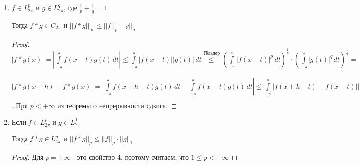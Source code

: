 \begin{properties}
\begin{enumerate}
{            \begin{proof}
                $c_k (f * g) = \frac{1}{2\pi} \int\limits_{-\pi}^\pi e^{ikx} f*g (x) \, dx = \frac{1}{2\pi} \int\limits_{-\pi}^\pi e^{ikx} \int\limits_{-\pi}^\pi f(x - t) g(t) \, dt \, dx = \\ 
                = \frac{1}{2\pi} \int\limits_{-\pi}^\pi \int\limits_{-\pi}^\pi e^{ik(x - t)}e^{ikt} f(x - t) g(t) \, dt \, dx = 
                \frac{1}{2\pi} \int\limits_{-\pi}^\pi e^{ikt} g(t) \int\limits_{-\pi}^\pi e^{ik(x - t)} f(\underbrace{x - t}_{=s}) \, dx \, dt = \\
                = \frac{1}{2\pi} \int\limits_{-\pi}^\pi e^{ikt} g(t) \int\limits_{x-\pi}^{x+\pi} e^{iks} f(s) \, ds \, dt  = c_k (f) \int\limits_{-\pi}^\pi e^{ikt} g(t) \, dt$
            \end{proof}
        }
        \item {
            $f \in L_{2\pi}^p$ и $g \in L_{2\pi}^q$, где $\frac{1}{p} + \frac{1}{q} = 1$

            Тогда $f * g \in C_{2\pi}$ и $||f * g||_{\infty} \leqslant ||f||_p \cdot ||g||_q$

            \begin{proof}
                $|f*g (x)| = \left|\int\limits_{-\pi}^\pi f(x - t) g(t) \, dt \right| \leqslant \int\limits_{-\pi}^\pi |f(x-t)||g(t)| \, dt \overset{\text{Гёльдер}}{\leqslant}
                \left( \int\limits_{-\pi}^\pi |f(x - t)|^p \, dt \right)^{\frac{1}{p}} \cdot \left( \int\limits_{-\pi}^\pi |g(t)|^q \, dt \right)^{\frac{1}{q}} = ||f||_p \cdot ||g||_q$

                $|f * g(x + h) - f * g (x)| = \left| \int\limits_{-\pi}^\pi f(x + h -t)g(t) \, dt - \int\limits_{-\pi}^\pi f(x - t)g(t) \, dt \right| \leqslant \int\limits_{-\pi}^\pi |f(x + h - t) - f(x - t)||g(t)| \, dt \leqslant 
                \left( \int\limits_{-\pi}^\pi|f(x + h - t - f(x - t))|^p \, dt \right)^{\frac{1}{p}} ||g||_q = \left( \int\limits_{-\pi}^\pi |f(s + h) - f(s)|^p \, ds \right)^{\frac{1}{p}} \cdot ||g||_q = \underbrace{||f_h - f||_p}_{\rightarrow 0} ||g||_q$. При $p < +\infty$ из теоремы о непрерывности сдвига.
            \end{proof}
        }
        \item {
            Если $f \in L_{2\pi}^p$ и $g \in L_{2\pi}^1$

            Тогда $f * g \in L_{2\pi}^p$ и $||f * g||_p \leqslant ||f||_p \cdot ||g||_1$

            \begin{proof}
                Для $p = +\infty$ - это свойство 4, поэтому считаем, что $1 \leqslant p < +\infty$


\end{proof}}
\end{enumerate}
\end{properties}
